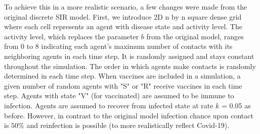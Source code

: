 \documentclass[12pt, reqno]{amsart}
\begin{document}
    To achieve this in a more realistic scenario, a few changes were made from the original discrete SIR model. First, we introduce 2D n by n square dense grid where each cell represents an agent with disease state and activity level. The activity level, which replaces the parameter \(b\) from the original model, ranges from 0 to 8 indicating each agent's maximum number of contacts with its neighboring agents in each time step. It is randomly assigned and stays constant throughout the simulation. The order in which agents make contacts is randomly determined in each time step. When vaccines are included in a simulation, a given number of random agents with "S" or "R" receive vaccines in each time step. Agents with state "V" (for vaccinated) are assumed to be immune to infection. Agents are assumed to recover from infected state at rate \(k\) = 0.05 as before. However, in contrast to the original model infection chance upon contact is \(50\%\) and reinfection is possible (to more realistically reflect Covid-19). 
    
\end{document}
